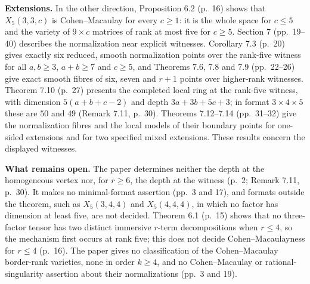 \documentclass[11pt,a4paper]{article}
\begin{document}
\textbf{Extensions.} In the other direction, Proposition 6.2 (p.~16)
shows that \(X_5(3,3,c)\) is Cohen--Macaulay for every \(c\geq1\): it is
the whole space for \(c\leq5\) and the variety of \(9\times c\) matrices
of rank at most five for \(c\geq5\). Section 7 (pp.~19--40) describes
the normalization near explicit witnesses. Corollary 7.3 (p.~20) gives
exactly six reduced, smooth normalization points over the rank-five
witness for all \(a,b\geq3\), \(a+b\geq7\) and \(c\geq5\), and Theorems
7.6, 7.8 and 7.9 (pp.~22--26) give exact smooth fibres of six, seven and
\(r+1\) points over higher-rank witnesses. Theorem 7.10 (p.~27) presents
the completed local ring at the rank-five witness, with dimension
\(5(a+b+c-2)\) and depth \(3a+3b+5c+3\); in format \(3\times4\times5\)
these are \(50\) and \(49\) (Remark 7.11, p.~30). Theorems 7.12--7.14
(pp.~31--32) give the normalization fibres and the local models of their
boundary points for one-sided extensions and for two specified mixed
extensions. These results concern the displayed witnesses.

\textbf{What remains open.} The paper determines neither the depth at
the homogeneous vertex nor, for \(r\geq6\), the depth at the witness
(p.~2; Remark 7.11, p.~30). It makes no minimal-format assertion (pp.~3
and 17), and formats outside the theorem, such as \(X_5(3,4,4)\) and
\(X_5(4,4,4)\), in which no factor has dimension at least five, are not
decided. Theorem 6.1 (p.~15) shows that no three-factor tensor has two
distinct immersive \(r\)-term decompositions when \(r\leq4\), so the
mechanism first occurs at rank five; this does not decide
Cohen--Macaulayness for \(r\leq4\) (p.~16). The paper gives no
classification of the Cohen--Macaulay border-rank varieties, none in
order \(k\geq4\), and no Cohen--Macaulay or rational-singularity
assertion about their normalizations (pp.~3 and 19).
\end{document}
